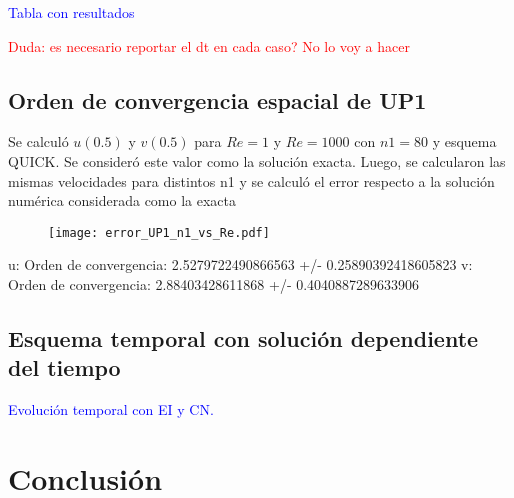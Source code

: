 \documentclass[aps,prb,twocolumn,superscriptaddress,floatfix,longbibliography,10pt]{revtex4-2}
\newcounter{para}
\begin{document}
\textcolor{blue}{Tabla con resultados}



\textcolor{red}{Duda: es necesario reportar el dt en cada caso? No lo voy a hacer}














\subsection{Orden de convergencia espacial de UP1}

Se calculó $u(0.5)$ y $v(0.5)$ para $Re = 1$ y $Re = 1000$ con $n1 = 80$ y esquema QUICK. Se consideró este valor como la solución exacta. Luego, se calcularon las mismas velocidades para distintos n1 y se calculó el error respecto a la solución numérica considerada como la exacta

\begin{figure}[h]
  \texttt{[image: error\_UP1\_n1\_vs\_Re.pdf]}
  \caption{}
   \label{fig:error_UP1_n1_vs_Re}
\end{figure}

u: Orden de convergencia:  2.5279722490866563 +/- 0.25890392418605823
v: Orden de convergencia:  2.88403428611868 +/- 0.4040887289633906


\subsection{Esquema temporal con solución dependiente del tiempo}


\textcolor{blue}{Evolución temporal con EI y CN.}





\section{Conclusión}


\end{document}
